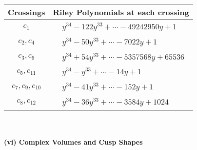 \documentclass[1p]{elsarticle_modified}
\theoremstyle{definition}
\begin{document}
\begin{tabular}{m{50pt}|m{274pt}}
Crossings & \hspace{64pt}Riley Polynomials at each crossing \\
\hline $$\begin{aligned}c_{1}\end{aligned}$$&$\begin{aligned}
&y^{34}-122 y^{33}+\cdots-49242950 y+1
\end{aligned}$\\
\hline $$\begin{aligned}c_{2},c_{4}\end{aligned}$$&$\begin{aligned}
&y^{34}-50 y^{33}+\cdots-7022 y+1
\end{aligned}$\\
\hline $$\begin{aligned}c_{3},c_{6}\end{aligned}$$&$\begin{aligned}
&y^{34}+54 y^{33}+\cdots-5357568 y+65536
\end{aligned}$\\
\hline $$\begin{aligned}c_{5},c_{11}\end{aligned}$$&$\begin{aligned}
&y^{34}- y^{33}+\cdots-14 y+1
\end{aligned}$\\
\hline $$\begin{aligned}c_{7},c_{9},c_{10}\end{aligned}$$&$\begin{aligned}
&y^{34}-41 y^{33}+\cdots-152 y+1
\end{aligned}$\\
\hline $$\begin{aligned}c_{8},c_{12}\end{aligned}$$&$\begin{aligned}
&y^{34}-36 y^{33}+\cdots-3584 y+1024
\end{aligned}$\\
\hline
\end{tabular}\\~\\
\newpage\flushleft \textbf{(vi) Complex Volumes and Cusp Shapes}
\end{document}
